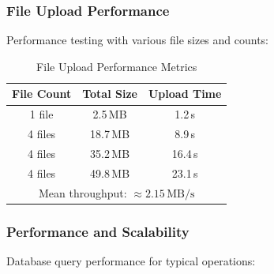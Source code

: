 \documentclass[10pt,twocolumn,a4paper]{article}
\begin{document}
\subsubsection{File Upload Performance}

Performance testing with various file sizes and counts:

\begin{table}[h]
\centering
\caption{File Upload Performance Metrics}
\label{tab:upload_perf}
\small
\begin{tabular}{|c|c|c|}
\hline
\textbf{File Count} & \textbf{Total Size} & \textbf{Upload Time} \\
\hline
1 file       & 2.5\,MB      & 1.2\,s \\
4 files      & 18.7\,MB     & 8.9\,s \\
4 files      & 35.2\,MB     & 16.4\,s \\
4 files      & 49.8\,MB     & 23.1\,s \\
\hline
\multicolumn{3}{|c|}{\small Mean throughput: $\approx 2.15\,\text{MB/s}$} \\
\hline
\end{tabular}

\end{table}

\subsubsection{Performance and Scalability}

Database query performance for typical operations:
\end{document}
